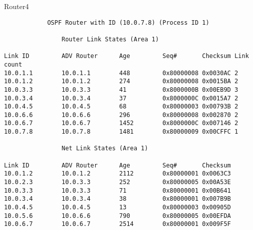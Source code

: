 Router4
\begin{lstlisting}
            OSPF Router with ID (10.0.7.8) (Process ID 1)                       
                                                                                
                Router Link States (Area 1)                                     
                                                                                
Link ID         ADV Router      Age         Seq#       Checksum Link count      
10.0.1.1        10.0.1.1        448         0x80000008 0x0030AC 2               
10.0.1.2        10.0.1.2        274         0x80000008 0x0015BA 2               
10.0.3.3        10.0.3.3        41          0x8000000B 0x00EB9D 3               
10.0.3.4        10.0.3.4        37          0x8000000C 0x0015A7 2               
10.0.4.5        10.0.4.5        68          0x80000003 0x00793B 2               
10.0.6.6        10.0.6.6        296         0x80000008 0x002870 2               
10.0.6.7        10.0.6.7        1452        0x8000000C 0x007146 2               
10.0.7.8        10.0.7.8        1481        0x80000009 0x00CFFC 1               
                                                                                
                Net Link States (Area 1)                                        
                                                                                
Link ID         ADV Router      Age         Seq#       Checksum                 
10.0.1.2        10.0.1.2        2112        0x80000001 0x0063C3                 
10.0.2.3        10.0.3.3        252         0x80000005 0x00A53E                 
10.0.3.3        10.0.3.3        71          0x80000001 0x00B641                 
10.0.3.4        10.0.3.4        38          0x80000001 0x007B9B                 
10.0.4.5        10.0.4.5        13          0x80000003 0x00905D                 
10.0.5.6        10.0.6.6        790         0x80000005 0x00EFDA                 
10.0.6.7        10.0.6.7        2514        0x80000001 0x009F5F  
\end{lstlisting}  
